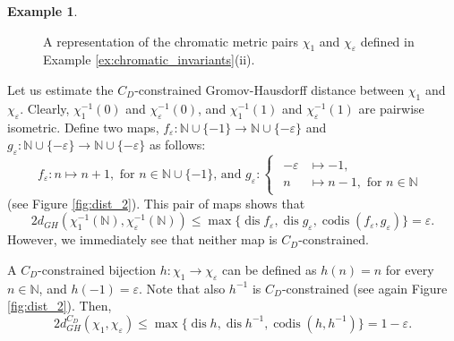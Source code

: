 \documentclass[8pt,a4paper,oneside,english,english]{article}
\theoremstyle{plain}
\theoremstyle
{plain}
\theoremstyle{definition}
\newtheorem{example}[theorem]{Example}%
\newcommand{\N}{\mathbb{N}}
\newcommand{\GH}{d_{GH}}
\DeclareMathOperator{\dis}{dis}
\DeclareMathOperator{\codis}{codis}
\begin{document}
\begin{example}
\begin{compactenum}[(i)]
\begin{figure}[h!]
    \caption{\footnotesize A representation of the chromatic metric pairs $\chi_1$ and $\chi_\varepsilon$ defined in Example  \ref{ex:chromatic_invariants}(ii).}
    \label{fig:dist}
\end{figure}
Let us estimate the $C_D$-constrained Gromov-Hausdorff distance between $\chi_1$ and $\chi_\varepsilon$. Clearly, $\chi_1^{-1}(0)$ and $\chi_\varepsilon^{-1}(0)$, and $\chi_1^{-1}(1)$ and $\chi_\varepsilon^{-1}(1)$ are pairwise isometric. Define two maps,  $f_\varepsilon\colon\N\cup\{-1\}\to\N\cup\{-\varepsilon\}$ and $g_\varepsilon\colon\N\cup\{-\varepsilon\}\to\N\cup\{-\varepsilon\}$ as follows:
\[
f_\varepsilon\colon n\mapsto n+1,\text{ for $n\in\N\cup\{-1\}$, and }g_\varepsilon\colon\begin{cases}
    \begin{aligned}
        -\varepsilon&\mapsto -1,\\
        n&\mapsto n-1,\text{ for $n\in\N$}
    \end{aligned}
\end{cases}
\]
(see Figure \ref{fig:dist_2}). This pair of maps shows that 
\[
2\GH(\chi_1^{-1}(\N),\chi_\varepsilon^{-1}(\N))\leq\max\{\dis f_\varepsilon,\dis g_\varepsilon,\codis(f_\varepsilon,g_\varepsilon)\}=\varepsilon.
\]
However, we immediately see that neither map is $C_D$-constrained.

A $C_D$-constrained bijection $h\colon\chi_1\to\chi_\varepsilon$ can be defined as $h(n)=n$ for every $n\in\N$, and $h(-1)=\varepsilon$. Note that also $h^{-1}$ is $C_D$-constrained (see again Figure \ref{fig:dist_2}). Then,
\[
2\GH^{C_D}(\chi_1,\chi_\varepsilon)\leq\max\{\dis h,\dis h^{-1},\codis(h,h^{-1})\}=1-\varepsilon.
\]

\begin{figure}
[h!]
    \centering
\end{figure}
\end{compactenum}
\end{example}
\end{document}
